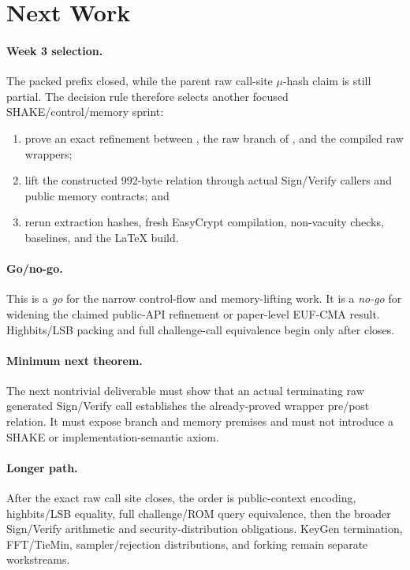 \section{Next Work}

\paragraph{Week 3 selection.}
The packed prefix closed, while the parent raw call-site \(\mu\)-hash claim is
still partial. The decision rule therefore selects another focused
SHAKE/control/memory sprint:
\begin{enumerate}
  \item prove an exact refinement between
  , the raw branch of
  , and the compiled raw wrappers;
  \item lift the constructed 992-byte relation through actual Sign/Verify
  callers and public memory contracts; and
  \item rerun extraction hashes, fresh EasyCrypt compilation, non-vacuity
  checks, baselines, and the LaTeX build.
\end{enumerate}

\paragraph{Go/no-go.}
This is a \emph{go} for the narrow control-flow and memory-lifting work. It is
a \emph{no-go} for widening the claimed public-API refinement or paper-level
EUF-CMA result. Highbits/LSB packing and full challenge-call equivalence begin
only after  closes.

\paragraph{Minimum next theorem.}
The next nontrivial deliverable must show that an actual terminating raw
generated Sign/Verify call establishes the already-proved wrapper pre/post
relation. It must expose branch and memory premises and must not introduce a
SHAKE or implementation-semantic axiom.

\paragraph{Longer path.}
After the exact raw call site closes, the order is public-context encoding,
highbits/LSB equality, full challenge/ROM query equivalence, then the broader
Sign/Verify arithmetic and security-distribution obligations. KeyGen
termination, FFT/TieMin, sampler/rejection distributions, and forking remain
separate workstreams.
